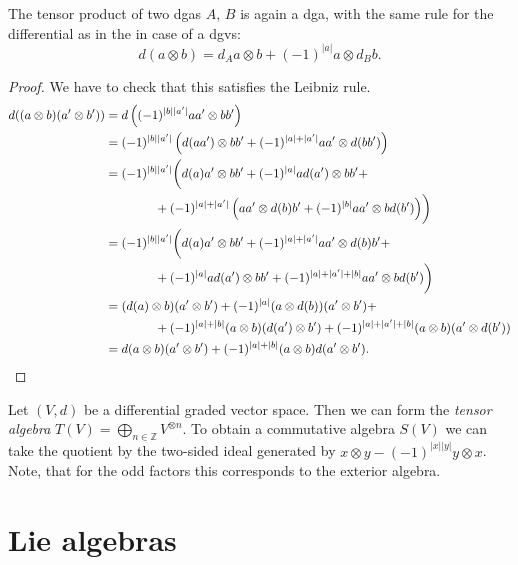 \documentclass[english,no-theorem-numbers]{short-notes}
\newcommand\degree[1]{|#1|}
\begin{document}
\begin{Prop}
The tensor product of two dgas $A$, $B$ is again a dga, with the same rule for the differential as in the in case of a dgvs:
\[
d(a \otimes b) = d_Aa \otimes b + (-1)^{\degree a} a \otimes d_B b.
\]
\end{Prop}
\begin{proof}
    We have to check that this satisfies the Leibniz rule.
    \begin{align*}
    d( (a \otimes b)(a'\otimes b')) & =
    d\left(  (-1)^{\degree b \degree{a'}} aa' \otimes bb' \right) \\ & =
    (-1)^{\degree b \degree{a'}} \left( d(aa') \otimes bb' + (-1)^{\degree a + \degree{a'}} aa' \otimes d(bb') \right) \\ & =
    (-1)^{\degree b \degree{a'}} \biggl( d(a)a' \otimes bb' + (-1)^{\degree a} ad(a') \otimes bb' + \\
        &\qquad\qquad + (-1)^{\degree a + \degree{a'}} \left( aa' \otimes d(b)b' + (-1)^{\degree b} aa' \otimes bd(b') \right) \biggr) \\ & =
    (-1)^{\degree b \degree{a'}} \biggl( d(a)a' \otimes bb' + (-1)^{\degree a + \degree{a'}} aa' \otimes d(b)b' + \\
        &\qquad\qquad + (-1)^{\degree a} ad(a') \otimes bb' + (-1)^{\degree a + \degree{a'} + \degree b}aa' \otimes bd(b') \biggr)\\ & =
    (d(a) \otimes b)(a' \otimes b') + (-1)^{\degree a}(a \otimes d(b))(a' \otimes b') + \\
        &\qquad\qquad + (-1)^{\degree a + \degree b} (a \otimes b)(d(a') \otimes b') + (-1)^{\degree a + \degree{a'} + \degree b} (a \otimes b)(a' \otimes d(b')) \\ & =
    d(a \otimes b)(a' \otimes b') + (-1)^{\degree a + \degree b}(a \otimes b)d(a' \otimes b').
    \qedhere
\end{align*}%
\end{proof}%

\begin{Ex}
    Let $(V,d)$ be a differential graded vector space.
    Then we can form the \emph{tensor algebra} $T(V) = \bigoplus_{n ∈ ℤ} V^{\otimes n}$.
    To obtain a commutative algebra $S(V)$ we can take the quotient by the two-sided ideal generated by $x \otimes y - (-1)^{\degree x \degree y} y \otimes x$.
    Note, that for the odd factors this corresponds to the exterior algebra.
\end{Ex}

\section{Lie algebras}
\end{document}
